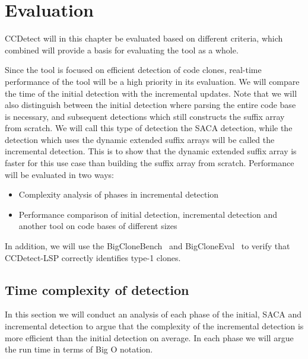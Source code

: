 \chapter{Evaluation}


CCDetect will in this chapter be evaluated based on different criteria, which combined
will provide a basis for evaluating the tool as a whole.

Since the tool is focused on efficient detection of code clones, real-time performance of
the tool will be a high priority in its evaluation. We will compare the time of the
initial detection with the incremental updates. Note that we will also distinguish between
the initial detection where parsing the entire code base is necessary, and subsequent
detections which still constructs the suffix array from scratch. We will call this type of
detection the SACA detection, while the detection which uses the dynamic extended suffix
arrays will be called the incremental detection. This is to show that the dynamic extended
suffix array is faster for this use case than building the suffix array from scratch.
Performance will be evaluated in two ways:

\begin{itemize}
    \item Complexity analysis of phases in incremental detection
    \item Performance comparison of initial detection, incremental detection and another
        tool on code bases of different sizes
\end{itemize}

In addition, we will use the BigCloneBench~\cite{BigCloneBench} and
BigCloneEval~\cite{BigCloneEval} to verify that CCDetect-LSP correctly identifies type-1
clones.

\section{Time complexity of detection}

In this section we will conduct an analysis of each phase of the initial, SACA and
incremental detection to argue that the complexity of the incremental detection is more
efficient than the initial detection on average. In each phase we will argue the run time
in terms of Big O notation.

